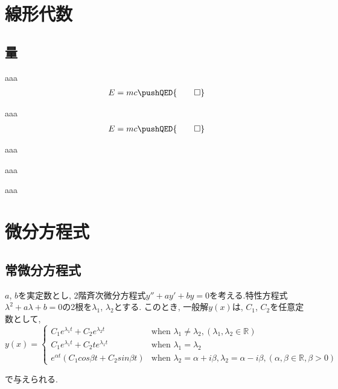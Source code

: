 \chapter{線形代数} %
\label{cha:線形代数}
\section{量} %
\label{sec:量}
\begin{dfn}
    aaa
    \begin{align}
        E = mc \pushQED{\qed}
    \end{align}
\end{dfn}
\begin{theo}
    aaa
    \begin{align}
        E = mc \pushQED{\qed}
    \end{align}
\end{theo}
\begin{prop}
    aaa
\end{prop}
\begin{lemma}
    aaa
\end{lemma}
\begin{cor}
    aaa
\end{cor}

\chapter{微分方程式} %
\label{cha:微分方程式}
\section{常微分方程式} %
\label{sec:常微分方程式}
\begin{theo}
    $a$, $b$を実定数とし, 2階斉次微分方程式$y''+ay'+by=0$を考える.特性方程式$\lambda^2+a\lambda+b=0$の2根を$\lambda_{1}$, $\lambda_{2}$とする. このとき, 一般解$y(x)$は, $C_{1}$, $C_{2}$を任意定数として, 
    \begin{equation}
        y(x)= \begin{cases}
                C_{1}e^{\lambda_{1} t}+C_{2}e^{\lambda_{2} t} &\text{when }\lambda_{1}\neq\lambda_{2}, (\lambda_{1}, \lambda_{2}\in\mathbb{R}) \\
                C_{1}e^{\lambda_{1} t}+C_{2}te^{\lambda_{1} t} &\text{when }\lambda_{1}=\lambda_{2} \\
                e^{\alpha t}(C_{1}cos{\beta t}+C_{2}sin{\beta t}) &\text{when }\lambda_{2}=\alpha+{i\beta}, \lambda_{2}=\alpha-{i\beta}, (\alpha, \beta\in\mathbb{R}, \beta>0)
        \end{cases}
    \end{equation}
\end{theo}
で与えられる.
